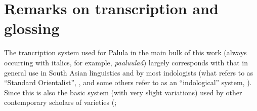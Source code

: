 

\section{Remarks on transcription and glossing}
\label{sec:1-7}

The trancription system used for Palula in the main bulk of this work (always occurring with
italics, for example, \textit{paaluulaá}) largely corresponds with that in general use in South Asian
linguistics and by most indologists (what \citeauthor{masica1991} refers to as ``Standard
Orientalist'', \citeyear[xv]{masica1991}, and some others refer to as an ``indological'' system,
\citealt[9]{radloff1999}). Since this is also the basic system (with very slight variations) used by other contemporary
scholars of \iliShina varieties
(\citealt{buddruss1987,buddruss1993,buddruss1996,degener2008,schmidtkohistani2001,schmidtkohistani2008,schmidt2000,schmidt2001,schmidt2003,schmidt2004,schmidt2004b, radloff1992,radloff1999};
